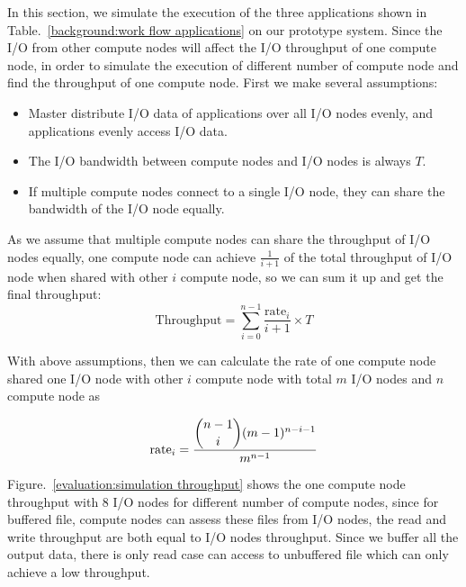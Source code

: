 
In this section, we simulate the execution of the three applications shown in
Table.~\ref{background:work flow applications} on our prototype system.
Since the I/O from other compute nodes will affect the I/O throughput of one compute node,
in order to simulate the execution of different number of compute node and find the throughput of
one compute node.
First we make several assumptions:
\begin{itemize}
  \item Master distribute I/O data of applications over all I/O nodes evenly, and applications
  evenly access I/O data.
  \item The I/O bandwidth between compute nodes and I/O nodes is always $T$.
  \item If multiple compute nodes connect to a single I/O node, they can share the bandwidth of the
  I/O node equally.
\end{itemize}

As we assume that multiple compute nodes can share the throughput of I/O nodes equally, one
compute node can achieve $\frac{1}{i+1}$ of the total throughput of I/O node when shared with other
$i$ compute node, so we can sum it up and get the final throughput:
\begin{equation}
\text{Throughput}=\sum_{i=0}^{n-1} \frac{\text{rate}_i}{i+1} \times T
\end{equation}

With above assumptions, then we can calculate the rate of one compute node shared one I/O node with
other $i$ compute node with total $m$ I/O nodes and $n$ compute node as

\begin{equation}
\text{rate}_i=\frac{\dbinom{n-1}{i}(m-1)^{n-i-1}}{m^{n-1}}
\end{equation}


Figure.~\ref{evaluation:simulation throughput} shows the one compute node throughput with 8 I/O
nodes for different number of compute nodes, since for buffered file, compute nodes can assess these
files from I/O nodes, the read and write throughput are both equal to I/O nodes throughput.
Since we buffer all the output data, there is only read case can access to unbuffered file which
can only achieve a low throughput.

